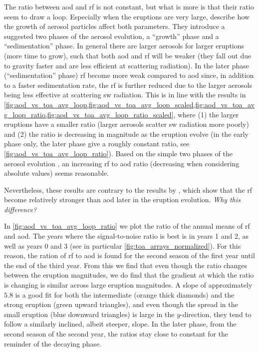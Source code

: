 \documentclass[twocol]{ametsocV5}
\begin{document}
The ratio between \acrshort{aod} and \acrshort{rf} is not constant, but what is more is
that their ratio seem to draw a loop. Especially when the eruptions are very large,
\citet[][see their sections 3.1.2, 3.2.2]{marshall2019} describe how the growth of
aerosol particles affect both parameters. They introduce a suggested two phases of the
aerosol evolution, a ``growth'' phase and a ``sedimentation'' phase. In general there
are larger aerosols for larger eruptions (more time to grow), such that both
\acrshort{aod} and \acrshort{rf} will be weaker (they fall out due to gravity faster and
are less efficient at scattering radiation). In the later phase (``sedimentation''
phase) \acrshort{rf} become more weak compared to \acrshort{aod} since, in addition to a
faster sedimentation rate, the \acrshort{rf} is further reduced due to the larger
aerosols being less effective at scattering \acrshort{sw} radiation. This is in line
with the results in
\cref{fig:aod_vs_toa_avg_loop,fig:aod_vs_toa_avg_loop_scaled,fig:aod_vs_toa_avg_loop_ratio,fig:aod_vs_toa_avg_loop_ratio_scaled},
where (1) the larger eruptions have a smaller ratio (larger aerosols scatter
\acrshort{sw} radiation more poorly) and (2) the ratio is decreasing in magnitude as the
eruption evolve (in the early phase only, the later phase give a roughly constant ratio,
see \cref{fig:aod_vs_toa_avg_loop_ratio}). Based on the simple two phases of the aerosol
evolution \citep{marshall2019}, an increasing \acrshort{rf} to \acrshort{aod} ratio
(decreasing when considering absolute values) seems reasonable.

Nevertheless, these results are contrary to the results by \citet[][their figure
  1c,d]{marshall2020}, which show that the \acrshort{rf} become relatively stronger than
\acrshort{aod} later in the eruption evolution. \emph{Why this difference?}

In \cref{fig:aod_vs_toa_avg_loop_ratio} we plot the ratio of the annual means of
\acrshort{rf} and \acrshort{aod}. The years where the signal-to-noise ratio is best is
in years 1 and 2, as well as years 0 and 3 (see in particular
\cref{fig:toa_arrays_normalized}). For this reason, the ration of \acrshort{rf} to
\acrshort{aod} is found for the second season of the first year until the end of the
third year. From this we find that even though the ratio changes between the eruption
magnitudes, we do find that the gradient at which the ratio is changing is similar
across large eruption magnitudes. A slope of approximately \( 5.8 \) is a good fit for
both the intermediate (orange thick diamonds) and the strong eruption (green upward
triangles), and even though the spread in the small eruption (blue downward triangles)
is large in the \( y \)-direction, they tend to follow a similarly inclined, albeit
steeper, slope. In the later phase, from the second season of the second year, the
ratios stay close to constant for the reminder of the decaying phase.
\end{document}
